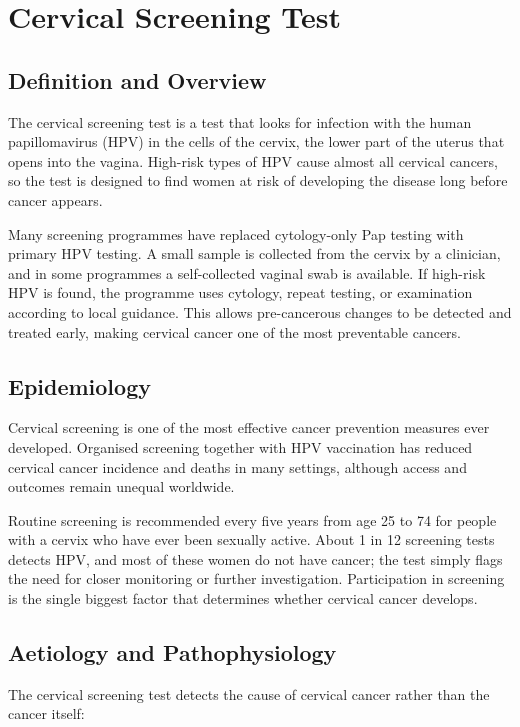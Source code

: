 \chapter{Cervical Screening Test}

\section*{Definition and Overview}
The cervical screening test is a test that looks for infection with the human papillomavirus (HPV) in the cells of the cervix, the lower part of the uterus that opens into the vagina. High-risk types of HPV cause almost all cervical cancers, so the test is designed to find women at risk of developing the disease long before cancer appears.

Many screening programmes have replaced cytology-only Pap testing with primary HPV testing. A small sample is collected from the cervix by a clinician, and in some programmes a self-collected vaginal swab is available. If high-risk HPV is found, the programme uses cytology, repeat testing, or examination according to local guidance. This allows pre-cancerous changes to be detected and treated early, making cervical cancer one of the most preventable cancers.

\section*{Epidemiology}
Cervical screening is one of the most effective cancer prevention measures ever developed. Organised screening together with HPV vaccination has reduced cervical cancer incidence and deaths in many settings, although access and outcomes remain unequal worldwide.

Routine screening is recommended every five years from age 25 to 74 for people with a cervix who have ever been sexually active. About 1 in 12 screening tests detects HPV, and most of these women do not have cancer; the test simply flags the need for closer monitoring or further investigation. Participation in screening is the single biggest factor that determines whether cervical cancer develops.

\section*{Aetiology and Pathophysiology}
The cervical screening test detects the cause of cervical cancer rather than the cancer itself:

